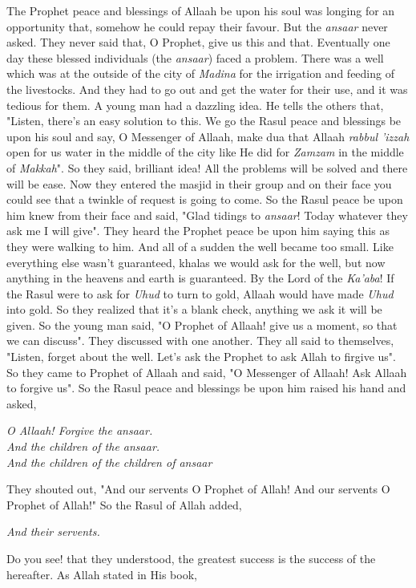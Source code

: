 {The Prophet peace and blessings of Allaah be upon his soul was longing for an opportunity that, somehow he could repay their favour. But the \textit{ansaar} never asked. They never said that, O Prophet, give us this and that. Eventually one day these blessed individuals (the \textit{ansaar}) faced a problem. There was a well which was at the outside of the city of \textit{Madina} for the irrigation and feeding of the livestocks. And they had to go out and get the water for their use, and it was tedious for them. A young man had a dazzling idea. He tells the others that, "Listen, there's an easy solution to this. We go the Rasul peace and blessings be upon his soul and say, O Messenger of Allaah, make dua that Allaah \textit{rabbul 'izzah} open for us water in the middle of the city like He did for \textit{Zamzam} in the middle of \textit{Makkah}". So they said, brilliant idea! All the problems will be solved and there will be ease. Now they entered the masjid in their group and on their face you could see that a twinkle of request is going to come. So the Rasul peace be upon him knew from their face and said, "Glad tidings to \textit{ansaar}! Today whatever they ask me I will give". They heard the Prophet peace be upon him saying this as they were walking to him. And all of a sudden the well became too small. Like everything else wasn't guaranteed, khalas we would ask for the well, but now anything in the heavens and earth is guaranteed. By the Lord of the \textit{Ka'aba}! If the Rasul were to ask for \textit{Uhud} to turn to gold, Allaah would have made \textit{Uhud} into gold. So they realized that it's a blank check, anything we ask it will be given. So the young man said, "O Prophet of Allaah! give us a moment, so that we can discuss". They discussed with one another. They all said to themselves, "Listen, forget about the well. Let's ask the Prophet to ask Allah to firgive us". So they came to Prophet of Allaah and said, "O Messenger of Allaah! Ask Allaah to forgive us". So the Rasul peace and blessings be upon him raised his hand and asked,
\begin{center}
    \textit{
        O Allaah! Forgive the ansaar.\\
        And the children of the ansaar.\\
        And the children of the children of ansaar
    }
\end{center}
They shouted out, "And our servents O Prophet of Allah! And our servents O Prophet of Allah!" So the Rasul of Allah added, 
\begin{center}
    \textit{And their servents.}
\end{center}

Do you see! that they understood, the greatest success is the success of the hereafter. As Allah stated in His book,
}
